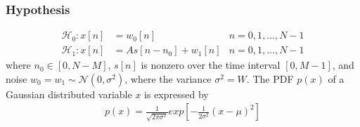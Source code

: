 \subsubsection{Hypothesis}
\begin{align}\label{eq:mf_hypothesis}
\mathcal{H}_0:x[n]&=w_0[n]  &n=0, 1,\ldots, N-1\\
\mathcal{H}_1:x[n]&=As[n-n_0]+w_1[n]  &n=0, 1,\ldots, N-1    
\end{align}
where $n_0\in[0, N-M]$, $s[n]$ is nonzero over the time interval $[0,M-1]$, and noise $w_0 = w_1\sim\mathcal{N}(0,\sigma^2)$, where the variance $\sigma^2 = W$. The PDF $p(x)$ of a Gaussian distributed variable $x$ is expressed by
\begin{align}
p(x)=\frac{1}{\sqrt{2\pi\sigma^2}}exp[-\frac{1}{2\sigma^2}(x-\mu)^2]
\end{align}
